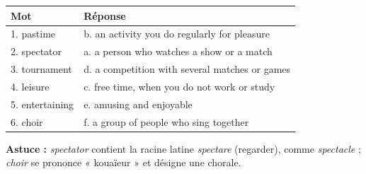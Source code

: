 \documentclass[11pt]{article}
\begin{document}
\begin{corrige}
\begin{center}
\begin{tabular}{|l|l|}
\hline
\rowcolor{popblueL} Mot & Réponse \\
\hline
1. pastime & b. an activity you do regularly for pleasure \\
\hline
2. spectator & a. a person who watches a show or a match \\
\hline
3. tournament & d. a competition with several matches or games \\
\hline
4. leisure & c. free time, when you do not work or study \\
\hline
5. entertaining & e. amusing and enjoyable \\
\hline
6. choir & f. a group of people who sing together \\
\hline
\end{tabular}
\end{center}
\textbf{Astuce :} \emph{spectator} contient la racine latine \emph{spectare} (regarder), comme \emph{spectacle} ; \emph{choir} se prononce « kouaïeur » et désigne une chorale.
\end{corrige}
\end{document}
